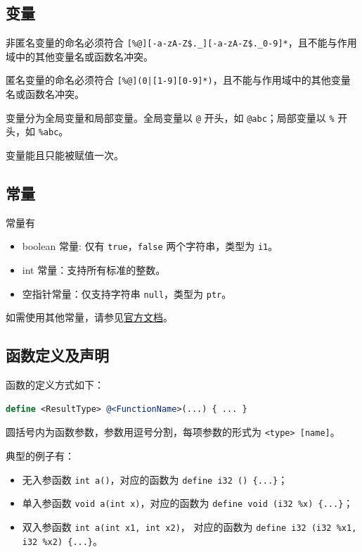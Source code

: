 \subsection{变量}\label{LLVM-variables}

非匿名变量的命名必须符合 \texttt{[\%@][-a-zA-Z\$.\_][-a-zA-Z\$.\_0-9]*}，且不能与作用域中的其他变量名或函数名冲突。

匿名变量的命名必须符合 \texttt{[\%@](0|[1-9][0-9]*)}，且不能与作用域中的其他变量名或函数名冲突。

变量分为全局变量和局部变量。全局变量以 \texttt @ 开头，如 \texttt{@abc}；局部变量以 \texttt \% 开头，如 \texttt{\%abc}。

变量能且只能被赋值一次。

\subsection{常量}\label{LLVM-constants}

常量有
\begin{itemize}
  \item boolean 常量: 仅有 \texttt{true}，\texttt{false} 两个字符串，类型为 \texttt{i1}。
  \item int 常量：支持所有标准的整数。
  \item 空指针常量：仅支持字符串 \texttt{null}，类型为 \texttt{ptr}。
\end{itemize}

\begin{remark}
如需使用其他常量，请参见\href{https://llvm.org/docs/LangRef.html\#constants}{官方文档}。
\end{remark}

\subsection{函数定义及声明}\label{LLVM-functions}

函数的定义方式如下：

\begin{lstlisting}[language=llvm]
define <ResultType> @<FunctionName>(...) { ... }
\end{lstlisting}

圆括号内为函数参数，参数用逗号分割，每项参数的形式为 \texttt{<type> [name]}。

典型的例子有：
\begin{itemize}
  \item 无入参函数 \texttt{int a()}，对应的函数为 \texttt{define i32 \@a() \{...\}}；
  \item 单入参函数 \texttt{void a(int x)}，对应的函数为 \texttt{define void \@a(i32 \%x) \{...\}}；
  \item 双入参函数 \texttt{int a(int x1, int x2)}，
    对应的函数为 \texttt{define i32 \@a(i32 \%x1, i32 \%x2) \{...\}}。
\end{itemize}

